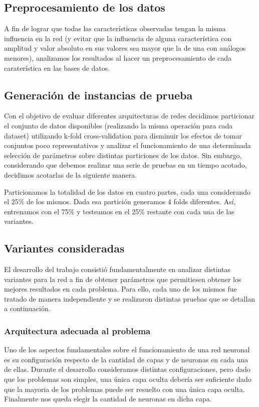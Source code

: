 \documentclass[informe.tex]{subfiles}
\begin{document}
    \vspace{15pt}

    
    
  \subsection{Preprocesamiento de los datos}
  
    A fin de lograr que todas las características observadas tengan la misma influencia en la red (y evitar que la influencia de alguna característica con amplitud y valor absoluto en sus valores sea mayor que la de una con análogos menores), analizamos los resultados al hacer un preprocesamiento de cada caraterística en las bases de datos.
    
  
  \subsection{Generación de instancias de prueba}

    Con el objetivo de evaluar diferentes arquitecturas de redes decidimos particionar el conjunto de datos disponibles (realizando la misma operación para cada dataset) utilizando k-fold cross-validation para disminuir los efectos de tomar conjuntos poco representativos y analizar el funcionamiento de una determinada selección de parámetros sobre distintas particiones de los datos. Sin embargo, considerando que debemos realizar una serie de pruebas en un tiempo acotado, decidimos acotarlas de la siguiente manera.
    
    Particionamos la totalidad de los datos en cuatro partes, cada una considerando el 25\% de los mismos. Dada esa partición generamos 4 folds diferentes. Así, entrenamos con el 75\% y testeamos en el 25\% restante con cada una de las variantes.
    
    
  \subsection{Variantes consideradas}

    El desarrollo del trabajo consisti\'o fundamentalmente en analizar distintas variantes para la red a fin de obtener par\'ametros que permitiesen obtener los mejores resultados en cada problema. Para ello, cada uno de los mismos fue tratado de manera independiente y se realizaron distintas pruebas que se detallan a continuaci\'on.

    \subsubsection{Arquitectura adecuada al problema}
      Uno de los aspectos fundamentales sobre el funcionamiento de una red neuronal es su configuraci\'on respecto de la cantidad de capas y de neuronas en cada una de ellas. Durante el desarrollo consideramos distintas configuraciones, pero dado que los problemas son simples, una \'unica capa oculta debería ser suficiente dado que la mayoria de los problemas puede ser resuelto con una única capa oculta\cite{nnwithJava}. Finalmente nos queda elegir la cantidad de neuronas en dicha capa. 
      
\end{document}

